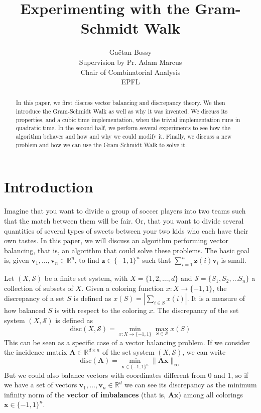 \documentclass[12pt]{article}
\title{Experimenting with the Gram-Schmidt Walk}
\author{Gaëtan Bossy\\
Supervision by Pr. Adam Marcus\\
Chair of Combinatorial Analysis\\
EPFL}
\begin{document}
\maketitle
\begin{abstract} In this paper, we first discuss vector balancing and discrepancy theory. We then introduce the Gram-Schmidt Walk as well as why it was invented. We discuss its properties, and a cubic time implementation, when the trivial implementation runs in quadratic time. In the second half, we perform several experiments to see how the algorithm behaves and how and why we could modify it. Finally, we discuss a new problem and how we can use the Gram-Schmidt Walk to solve it. \end{abstract}

\section{Introduction}
Imagine that you want to divide a group of soccer players into two teams such that the match between them will be fair. Or, that you want to divide several quantities of several types of sweets between your two kids who each have their own tastes. In this paper, we will discuss an algorithm performing vector balancing, that is, an algorithm that could solve these problems. The basic goal is, given $\textbf{v}_1,\dots,\textbf{v}_n\in\mathbb{R}^n$, to find $\textbf{z}\in\{-1,1\}^n$ such that $\sum_{i=1}^n\textbf{z}(i)\textbf{v}_i$ is small. 

Let $(X, \mathcal{S})$ be a finite set system, with $X = \{1, 2, \dots, d\}$ and $\mathcal{S}= \{S_1, S_2, \dots S_n\}$ a collection of subsets of $X$. Given a coloring function $x : X \rightarrow \{-1, 1\}$, the discrepancy of a set $S$ is defined as $x(S)= |\sum_{i \in S}x(i)|$. It is a measure of how balanced $S$ is with respect to the coloring $x$. The discrepancy of the set system $(X,\mathcal{S})$ is defined as 
$$\textrm{disc}(X,\mathcal{S}) = \min_{x: X\rightarrow \{-1, 1\}} \max_{S \in \mathcal{S}} x(S)$$
This can be seen as a specific case of a vector balancing problem. If we consider the incidence matrix $\textbf{A} \in \mathbb{R}^{d \times n}$ of the set system $(X, \mathcal{S})$, we can write 
$$\textrm{disc}(\textbf{A})= \min_{\textbf{x} \in \{-1, 1\}^n} \|\textbf{A}\textbf{x}\|_\infty$$
But we could also balance vectors with coordinates different from 0 and 1, so if we have a set of vectors $\textbf{v}_1,\dots,\textbf{v}_n\in\mathbb{R}^d$ we can see its discrepancy as the minimum infinity norm of the \textbf{vector of imbalances} (that is, $\textbf{Ax}$) among all colorings $\textbf{x}\in\{-1,1\}^n$.
\end{document}
